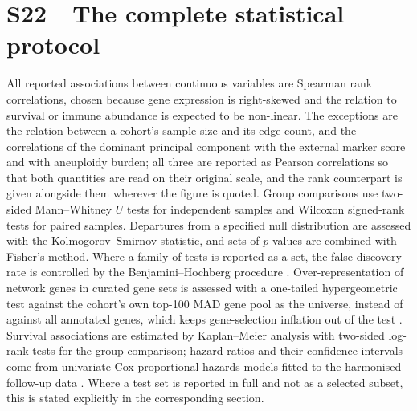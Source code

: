\documentclass[11pt]{article}
\begin{document}
\section*{S22\ \ The complete statistical protocol}

All reported associations between continuous variables are Spearman rank correlations, chosen because gene expression is right-skewed and the relation to survival or immune abundance is expected to be non-linear. The exceptions are the relation between a cohort's sample size and its edge count, and the correlations of the dominant principal component with the external marker score and with aneuploidy burden; all three are reported as Pearson correlations so that both quantities are read on their original scale, and the rank counterpart is given alongside them wherever the figure is quoted. Group comparisons use two-sided Mann--Whitney $U$ tests for independent samples and Wilcoxon signed-rank tests for paired samples. Departures from a specified null distribution are assessed with the Kolmogorov--Smirnov statistic, and sets of $p$-values are combined with Fisher's method. Where a family of tests is reported as a set, the false-discovery rate is controlled by the Benjamini--Hochberg procedure \citep{benjamini1995fdr}. Over-representation of network genes in curated gene sets is assessed with a one-tailed hypergeometric test against the cohort's own top-100 MAD gene pool as the universe, instead of against all annotated genes, which keeps gene-selection inflation out of the test \citep{subramanian2005gene,liberzon2015msigdb}. Survival associations are estimated by Kaplan--Meier analysis with two-sided log-rank tests for the group comparison; hazard ratios and their confidence intervals come from univariate Cox proportional-hazards models fitted to the harmonised follow-up data \citep{liu2018clinical}. Where a test set is reported in full and not as a selected subset, this is stated explicitly in the corresponding section.
\end{document}
